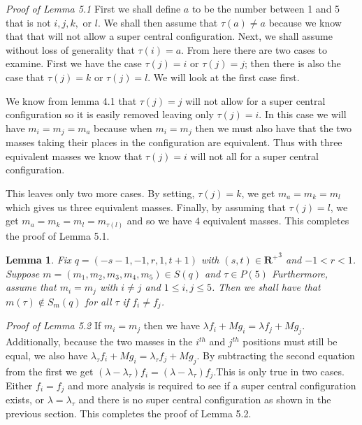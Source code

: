 \documentclass[11pt,leqno]{article}
\newtheorem{lemma}[theorem]{Lemma}
\theoremstyle{definition}
\theoremstyle{remark}
\numberwithin{equation}{section}
\begin{document}
\textit{Proof of Lemma 5.1}
First we shall define $a$ to be the number between 1 and 5 that is not $i,j,k,$ or $l$. We shall then assume that $\tau(a)\neq a$ because we know that that will not allow a super central configuration. Next, we shall assume without loss of generality that $\tau(i)=a$. From here there are two cases to examine. First we have the case $\tau(j)=i$ or $\tau(j)=j$; then there is also the case that $\tau(j)=k$ or $\tau(j)=l$. We will look at the first case first. 

We know from lemma 4.1 that $\tau(j)=j$ will not allow for a super central configuration so it is easily removed leaving only $\tau(j)=i$. In this case we will have $m_i=m_j=m_a$ because when $m_i=m_j$ then we must also have that the two masses taking their places in the configuration are equivalent. Thus with three equivalent masses we know that $\tau(j)=i$ will not all for a super central configuration.

This leaves only two more cases. By setting, $\tau(j)=k$, we get $m_a=m_k=m_l$ which gives us three equivalent masses. Finally, by assuming that $\tau(j)=l$, we get $m_a=m_k=m_l=m_{\tau(l)}$ and so we have $4$ equivalent masses. This completes the proof of Lemma 5.1.

\begin{lemma}
Fix $q=(-s-1, -1, r, 1, t+1)$ with $(s,t)\in \mathbf{R^+}^3$ and $-1<r<1$. Suppose $m=(m_1, m_2, m_3, m_4, m_5)\in S(q)$ and $\tau \in P(5)$ Furthermore, assume that $m_i=m_j$ with $i\neq j$ and $1\leq i,j \leq 5$. Then we shall have that $m(\tau) \notin S_m(q)$ for all $\tau$ if $f_i \neq f_j$.
\end{lemma}

\textit{Proof of Lemma 5.2}
If $m_i=m_j$ then we have $\lambda f_i +Mg_i=\lambda f_j+Mg_j$. Additionally, because the two masses in the $i^{th}$ and $j^{th}$ positions must still be equal, we also have $\lambda_{\tau} f_i +Mg_i=\lambda_{\tau} f_j+Mg_j$. By subtracting the second equation from the first we get $(\lambda-\lambda_{\tau})f_i=(\lambda-\lambda_{\tau})f_j$.This is only true in two cases. Either $f_i=f_j$ and more analysis is required to see if a super central configuration exists, or $\lambda=\lambda_{\tau}$ and there is no super central configuration as shown in the previous section. This completes the proof of Lemma 5.2.


\end{document}
